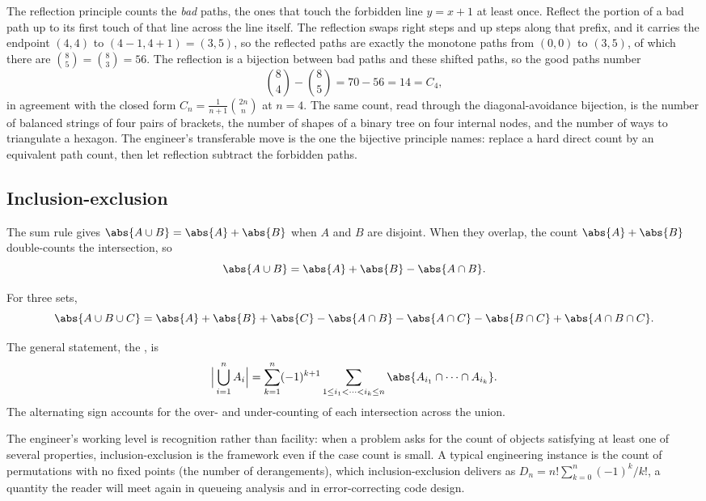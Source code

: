 The reflection principle counts the \emph{bad} paths, the ones that
touch the forbidden line $y = x + 1$ at least once. Reflect the
portion of a bad path up to its first touch of that line across the
line itself. The reflection swaps right steps and up steps along that
prefix, and it carries the endpoint $(4, 4)$ to $(4 - 1, 4 + 1) =
(3, 5)$, so the reflected paths are exactly the monotone paths from
$(0, 0)$ to $(3, 5)$, of which there are $\binom{8}{5} = \binom{8}{3}
= 56$. The reflection is a bijection between bad paths and these
shifted paths, so the good paths number
\[
\binom{8}{4} - \binom{8}{5} = 70 - 56 = 14 = C_{4},
\]
in agreement with the closed form $C_{n} = \frac{1}{n+1}
\binom{2n}{n}$ at $n = 4$. The same count, read through the
diagonal-avoidance bijection, is the number of balanced strings of
four pairs of brackets, the number of shapes of a binary tree on
four internal nodes, and the number of ways to triangulate a hexagon.
The engineer's transferable move is the one the bijective principle
names: replace a hard direct count by an equivalent path count, then
let reflection subtract the forbidden paths.



\subsection{Inclusion-exclusion}

The sum rule gives $\abs{A \cup B} = \abs{A} + \abs{B}$ when $A$
and $B$ are disjoint. When they overlap, the count $\abs{A} + \abs{B}$
double-counts the intersection, so
\[
\abs{A \cup B} = \abs{A} + \abs{B} - \abs{A \cap B}.
\]

For three sets,
\[
\abs{A \cup B \cup C} = \abs{A} + \abs{B} + \abs{C} - \abs{A \cap B}
- \abs{A \cap C} - \abs{B \cap C} + \abs{A \cap B \cap C}.
\]

The general statement, the ,
is
\[
\Big| \bigcup_{i=1}^{n} A_{i} \Big| = \sum_{k=1}^{n}
(-1)^{k+1} \sum_{1 \leq i_{1} < \cdots < i_{k} \leq n}
\abs{A_{i_{1}} \cap \cdots \cap A_{i_{k}}}.
\]
The alternating sign accounts for the over- and under-counting of
each intersection across the union.

The engineer's working level is recognition rather than facility:
when a problem asks for the count of objects satisfying at least
one of several properties, inclusion-exclusion is the framework
even if the case count is small. A typical engineering instance is
the count of permutations with no fixed points (the number of
derangements), which inclusion-exclusion delivers as $D_{n} = n!
\sum_{k=0}^{n} (-1)^{k}/k!$, a quantity the reader will meet again
in queueing analysis and in error-correcting code design.


